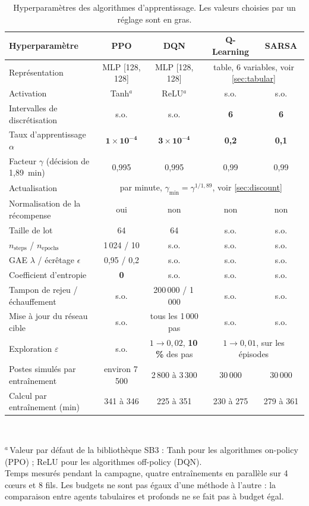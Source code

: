 \documentclass[11pt,a4paper]{article}
\newif\ifrevmarks
\newcommand{\revtag}[1]{\ifrevmarks\textsuperscript{\textcolor{red!70!black}{\scriptsize[#1]}}\fi}
\newcommand{\rev}[2]{\ifrevmarks{\color{revcolor}#2}\revtag{#1}\else#2\fi}
\newif\ifcorrmarks
\newcommand{\corr}[1]{\ifcorrmarks\textcolor{corrcolor}{#1}\else#1\fi}
\begin{document}
\begin{table}[H]
\centering
\caption{\rev{M12, v3}{Hyperparamètres des algorithmes d'apprentissage. Les valeurs choisies par un réglage sont en gras.}}
\label{tab:hyper}
\footnotesize
\setlength{\tabcolsep}{4pt}
\begin{tabular}{lcccc}
\toprule
\textbf{Hyperparamètre} & \textbf{PPO} & \textbf{DQN} & \textbf{Q-Learning} & \textbf{SARSA} \\
\midrule
Représentation                 & MLP [128, 128] & MLP [128, 128] & \multicolumn{2}{c}{table, 6 variables, voir \cref{sec:tabular}} \\
Activation                     & Tanh$^{a}$     & ReLU$^{a}$     & s.o. & s.o. \\
Intervalles de discrétisation  & s.o. & s.o. & \textbf{6} & \textbf{6} \\
Taux d'apprentissage $\alpha$  & $\mathbf{1\times10^{-4}}$ & $\mathbf{3\times10^{-4}}$ & \textbf{0,2} & \textbf{0,1} \\
Facteur $\gamma$ (décision de 1,89~min) & 0,995 & 0,995 & 0,99 & 0,99 \\
Actualisation                  & \multicolumn{4}{c}{par minute, $\gamma_{\min} = \gamma^{1/1{,}89}$, voir \cref{sec:discount}} \\
Normalisation de la récompense & oui & non & non & non \\
Taille de lot                  & 64             & 64             & s.o. & s.o. \\
$n_{\mathrm{steps}}$ / $n_{\mathrm{epochs}}$ & 1\,024 / 10 & s.o. & s.o. & s.o. \\
GAE $\lambda$ / écrêtage $\epsilon$ & 0,95 / 0,2 & s.o. & s.o. & s.o. \\
Coefficient d'entropie         & \textbf{0}     & s.o. & s.o. & s.o. \\
Tampon de rejeu / échauffement & s.o. & 200\,000 / 1\,000 & s.o. & s.o. \\
Mise à jour du réseau cible    & s.o. & tous les 1\,000 pas & s.o. & s.o. \\
Exploration $\varepsilon$      & s.o. & $1\to0{,}02$, \textbf{10\,\%} des pas & \multicolumn{2}{c}{$1\to0{,}01$, sur les épisodes} \\
\corr{Postes simulés par entraînement} & \corr{environ 7\,500} & \corr{2\,800 à 3\,300} & \corr{30\,000} & \corr{30\,000} \\
\corr{Calcul par entraînement (min)} & \corr{341 à 346} & \corr{225 à 351} & \corr{230 à 275} & \corr{279 à 361} \\
\bottomrule
\end{tabular}
\\[4pt]
\raggedright
\footnotesize $^{a}$\,Valeur par défaut de la bibliothèque SB3 : Tanh pour les algorithmes on-policy (PPO) ; ReLU pour les algorithmes off-policy (DQN).\\
\corr{Temps mesurés pendant la campagne, quatre entraînements en parallèle sur 4 cœurs et 8 fils. Les budgets ne sont pas égaux d'une méthode à l'autre : la comparaison entre agents tabulaires et profonds ne se fait pas à budget égal.}\\
\end{table}
\end{document}
